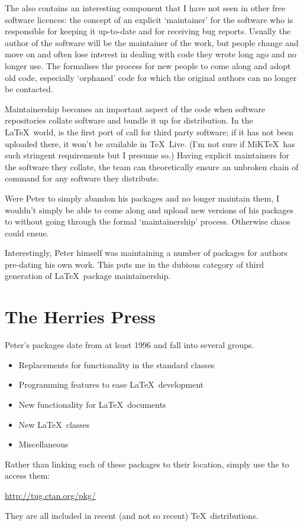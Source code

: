 \documentclass{ltugboat}
\begin{document}
The  also contains an interesting component that I have not seen in other free software licences: the concept of an explicit `maintainer' for the software who is responsible for keeping it up-to-date and for receiving bug reports. Usually the author of the software will be the maintainer of the work, but people change and move on and often lose interest in dealing with code they wrote long ago and no longer use. The  formalises the process for new people to come along and adopt old code, especially `orphaned' code for which the original authors can no longer be contacted.

Maintainership becomes an important aspect of the code when software repositories collate software and bundle it up for distribution. In the \LaTeX\ world,  is the first port of call for third party software; if it has not been uploaded there, it won't be available in \TeX\ Live. (I'm not sure if MiK\TeX\ has such stringent requirements but I presume so.) Having explicit maintainers for the software they collate, the  team can theoretically ensure an unbroken chain of command for any software they distribute.

Were Peter to simply abandon his packages and no longer maintain them, I wouldn't simply be able to come along and upload new versions of his packages to  without going through the formal `maintainership' process. Otherwise chaos could ensue.

Interestingly, Peter himself was maintaining a number of packages for authors pre-dating his own work. This puts me in the dubious category of third generation of \LaTeX\ package maintainership.

\section{The Herries Press}

Peter's packages date from at least 1996 and fall into several groups.
\begin{itemize}
\item Replacements for functionality in the standard classes
\item Programming features to ease \LaTeX\ development
\item New functionality for \LaTeX\ documents
\item New \LaTeX\ classes
\item Miscellaneous
\end{itemize}
Rather than linking each of these packages to their  location, simply use the  to access them:\\ \centerline{\url{http://tug.ctan.org/pkg/}}
They are all included in recent (and not so recent) \TeX\ distributions.
\end{document}
